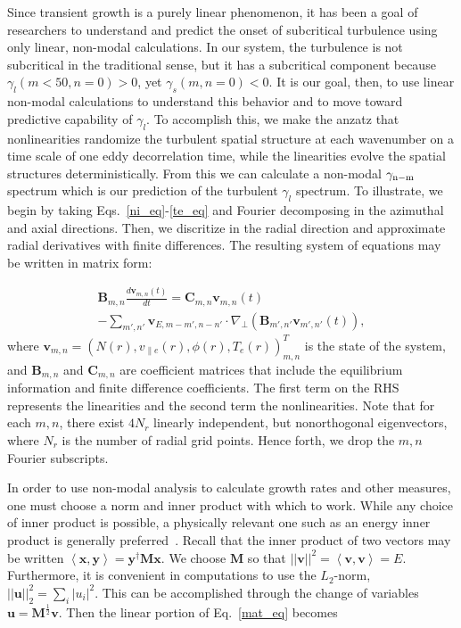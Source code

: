 \documentclass[letter,scriptaddress,twocolumn, prl,showkeys]{revtex4}
\def\beqar{\begin{eqnarray}}
\def\eeqar{\end{eqnarray}}
\newcommand{\diff}[2]{\frac{d#1}{d#2}}
\def\grad{\nabla}
\newcommand{\gradperp}{\grad_\perp}
\newcommand{\vpe}{v_{\parallel e}}
\begin{document}
Since transient growth is a purely linear phenomenon, it has been a goal of researchers to understand and predict the onset of subcritical turbulence using only linear, non-modal calculations. 
In our system, the turbulence is not subcritical in the traditional sense, but it has a subcritical component because $\gamma_l(m<50,n=0) > 0$, yet $\gamma_s(m,n=0) < 0$. 
It is our goal, then, to use linear non-modal calculations to understand this behavior and to move toward predictive capability of $\gamma_l$.
To accomplish this, we make the anzatz that nonlinearities randomize the turbulent spatial structure at each wavenumber on a time scale of 
one eddy decorrelation time, while the linearities evolve the spatial structures deterministically. From this we can calculate a non-modal $\gamma_{\rm{n-m}}$ spectrum
which is our prediction of the turbulent $\gamma_l$ spectrum. To illustrate,
we begin by taking Eqs.~\ref{ni_eq}-\ref{te_eq} and Fourier decomposing in the azimuthal and axial directions.  Then, we discritize in the radial direction and
approximate radial derivatives with finite differences.  The resulting system of equations may be written in matrix form:

\beqar
\label{mat_eq}
\mathbf{B}_{m,n} \diff{\mathbf{v}_{m,n}(t)}{t} = \mathbf{C}_{m,n} \mathbf{v}_{m,n}(t) \nonumber \\
- \sum_{m',n'}  \mathbf{v}_{E,m-m',n-n'} \cdot \gradperp \left( \mathbf{B}_{m',n'} \mathbf{v}_{m',n'}(t) \right),
\eeqar
where $\mathbf{v}_{m,n} = \left( N(r), \vpe(r), \phi(r), T_e(r) \right)_{m,n}^{T}$ is the state of the system,
and $\mathbf{B}_{m,n}$ and $\mathbf{C}_{m,n}$ are coefficient matrices that include the equilibrium information and finite difference coefficients. The first term on the RHS represents the linearities
and the second term the nonlinearities. Note that for each $m,n$, there exist $4 N_r$ linearly independent, but nonorthogonal eigenvectors, where $N_r$ is the number of radial grid points. 
Hence forth, we drop the $m,n$ Fourier subscripts.

In order to use non-modal analysis to calculate growth rates and other measures, one must choose a norm and inner product with which to work. While any choice of
inner product is possible, a physically relevant one such as an energy inner product is generally preferred~\cite{camargo1998,schmid2007,camporeale2010}. 
Recall that the inner product of two vectors may be written $\left< \mathbf{x},\mathbf{y} \right> = \mathbf{y}^{\dagger} \mathbf{M} \mathbf{x}$.
We choose $\mathbf{M}$ so that $||\mathbf{v}||^2 = \left< \mathbf{v},\mathbf{v} \right> = E$. Furthermore, it is convenient in
computations to use the $L_2$-norm, $||\mathbf{u}||_2^2 = \sum_i |u_i|^2$. This can be accomplished through the change of variables $\mathbf{u} = \mathbf{M}^{\frac{1}{2}} \mathbf{v}$.
Then the linear portion of Eq.~\ref{mat_eq} becomes
\end{document}
